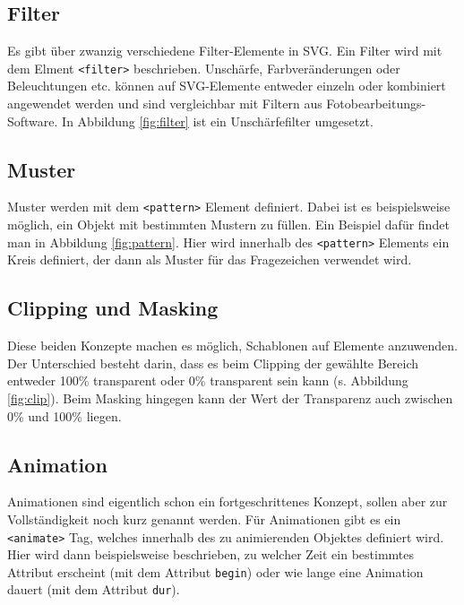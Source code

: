 \subsection{Filter}
Es gibt über zwanzig verschiedene Filter-Elemente in SVG. Ein Filter wird mit dem Elment \texttt{<filter>} beschrieben. Unschärfe, Farbveränderungen oder Beleuchtungen etc. können auf SVG-Elemente entweder einzeln oder kombiniert angewendet werden und sind vergleichbar mit Filtern aus Fotobearbeitungs-Software. In Abbildung \ref{fig:filter} ist ein Unschärfefilter umgesetzt.

\subsection{Muster}
Muster werden mit dem \texttt{<pattern>} Element definiert. Dabei ist es beispielsweise möglich, ein Objekt mit bestimmten Mustern zu füllen. Ein Beispiel dafür findet man in Abbildung \ref{fig:pattern}.
Hier wird innerhalb des \texttt{<pattern>} Elements ein Kreis definiert, der dann als Muster für das Fragezeichen verwendet wird.

\subsection{Clipping und Masking}
Diese beiden Konzepte machen es möglich, Schablonen auf Elemente anzuwenden. Der Unterschied besteht darin, dass es beim Clipping der gewählte Bereich entweder 100\% transparent oder 0\% transparent sein kann (s. Abbildung \ref{fig:clip}). Beim Masking hingegen kann der Wert der Transparenz auch zwischen 0\% und 100\% liegen.

\subsection{Animation}
Animationen sind eigentlich schon ein fortgeschrittenes Konzept, sollen aber zur Vollständigkeit noch kurz genannt werden. Für Animationen gibt es ein \texttt{<animate>} Tag, welches innerhalb des zu animierenden Objektes definiert wird. Hier wird dann beispielsweise beschrieben, zu welcher Zeit ein bestimmtes Attribut erscheint (mit dem Attribut \texttt{begin}) oder wie lange eine Animation dauert (mit dem Attribut \texttt{dur}).

\newpage